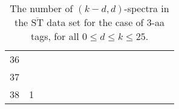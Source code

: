\documentclass{article}
\def\STbar{{\overline{\mathrm{ST}}}}
\begin{document}
\begin{table}[h]
{\begin{tabular}{|c|c|
c|c|c|c|c|c|c|c|c|c|c|c|c|c|}
36  &  &  &  &  &  &  &  &  &  &  &  &  &  &  & \\

37  &  &  &  &  &  &  &  &  &  &  &  &  &  &  & \\

38  & 1 &  &  &  &  &  &  &  &  &  &  &  &  &  & \\

  \hline
\end{tabular}
\par}
\centering
\caption{The number of $(k-d,d)$-spectra in the $\STbar$ data set for the case of 3-aa tags, for all $0\le d\le k\le 25$.}
\vspace{3mm}
\label{table:kd-1-ST}
\end{table}
\end{document}
